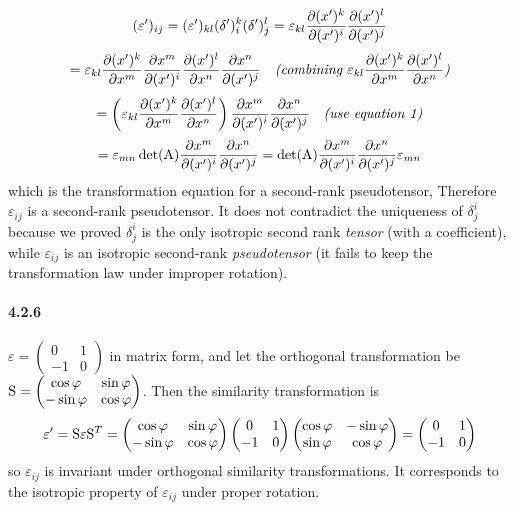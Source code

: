 \documentclass[a4paper]{article}
\begin{document}
\[
(\varepsilon')_{ij}=(\varepsilon')_{kl}(\delta')^k_i(\delta')^l_j=\varepsilon_{kl}\frac{\partial(x')^k}{\partial(x')^i}\frac{\partial(x')^l}{\partial(x')^j}\]
\[
=\varepsilon_{kl}\frac{\partial(x')^k}{\partial x^m}\frac{\partial x^m}{\partial(x')^i}\frac{\partial(x')^l}{\partial x^n}\frac{\partial x^n}{\partial(x')^j}\quad\textit{(combining $\varepsilon_{kl}\frac{\partial(x')^k}{\partial x^m}\frac{\partial(x')^l}{\partial x^n}$)}
\]
\[
=\left(\varepsilon_{kl}\frac{\partial(x')^k}{\partial x^m}\frac{\partial(x')^l}{\partial x^n}\right)\frac{\partial x^m}{\partial(x')^i}\frac{\partial x^n}{\partial(x')^j}\quad\textit{(use equation 1)}
\]
\[
=\varepsilon_{mn}\det(\mathrm{A})\frac{\partial x^m}{\partial(x')^i}\frac{\partial x^n}{\partial(x')^j}=\det(\mathrm{A})\frac{\partial x^m}{\partial(x')^i}\frac{\partial x^n}{\partial(x')^j}\varepsilon_{mn}
\]
which is the transformation equation for a second-rank pseudotensor, Therefore $\varepsilon_{ij}$ is a second-rank pseudotensor. It does not contradict the uniqueness of $\delta^i_j$ because we proved $\delta^i_j$ is the only isotropic second rank \textit{tensor} (with a coefficient), while $\varepsilon_{ij}$ is an isotropic second-rank \textit{pseudotensor} (it fails to keep the transformation law under improper rotation). 

\paragraph{4.2.6}
$\varepsilon=
\begin{pmatrix}
0&1\\-1&0
\end{pmatrix}$ in matrix form, and let the orthogonal transformation be  
$\mathrm{S}=
\begin{pmatrix}
\cos\varphi&\sin\varphi\\-\sin\varphi&\cos\varphi
\end{pmatrix}$. Then the similarity transformation is 
\[
\varepsilon'=\mathrm{S}\varepsilon{\mathrm{S}}^T=
\begin{pmatrix}
\cos\varphi&\sin\varphi\\-\sin\varphi&\cos\varphi
\end{pmatrix}
\begin{pmatrix}
0&1\\-1&0
\end{pmatrix}
\begin{pmatrix}
\cos\varphi&-\sin\varphi\\\sin\varphi&\cos\varphi
\end{pmatrix}=
\begin{pmatrix}
0&1\\-1&0
\end{pmatrix}
\]
so $\varepsilon_{ij}$ is invariant under orthogonal similarity transformations. It corresponds to the isotropic property of $\varepsilon_{ij}$ under proper rotation.
\end{document}

